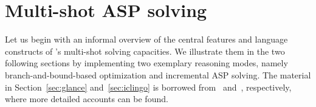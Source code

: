 
\section{Multi-shot ASP solving}
\label{sec:multi}

Let us begin with an informal overview of the central features and language constructs of \clingo's multi-shot solving capacities.
We illustrate them in the two following sections by implementing two exemplary reasoning modes, namely branch-and-bound-based optimization and incremental ASP solving.
The material in Section~\ref{sec:glance} and~\ref{sec:iclingo} is borrowed from~\cite{gekakasc14b} and~\cite{gekaobsc15a}, respectively,
where more detailed accounts can be found.




